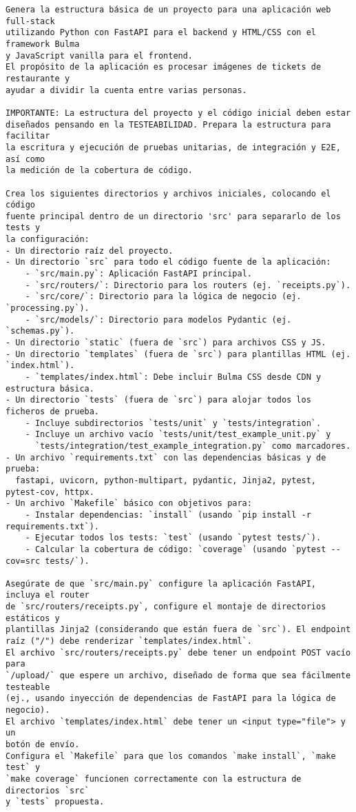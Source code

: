 \documentclass[a4paper, 11pt]{article}
\begin{document}
\begin{verbatim}
Genera la estructura básica de un proyecto para una aplicación web full-stack 
utilizando Python con FastAPI para el backend y HTML/CSS con el framework Bulma 
y JavaScript vanilla para el frontend. 
El propósito de la aplicación es procesar imágenes de tickets de restaurante y 
ayudar a dividir la cuenta entre varias personas.

IMPORTANTE: La estructura del proyecto y el código inicial deben estar 
diseñados pensando en la TESTEABILIDAD. Prepara la estructura para facilitar 
la escritura y ejecución de pruebas unitarias, de integración y E2E, así como 
la medición de la cobertura de código.

Crea los siguientes directorios y archivos iniciales, colocando el código 
fuente principal dentro de un directorio 'src' para separarlo de los tests y 
la configuración:
- Un directorio raíz del proyecto.
- Un directorio `src` para todo el código fuente de la aplicación:
    - `src/main.py`: Aplicación FastAPI principal.
    - `src/routers/`: Directorio para los routers (ej. `receipts.py`).
    - `src/core/`: Directorio para la lógica de negocio (ej. `processing.py`).
    - `src/models/`: Directorio para modelos Pydantic (ej. `schemas.py`).
- Un directorio `static` (fuera de `src`) para archivos CSS y JS.
- Un directorio `templates` (fuera de `src`) para plantillas HTML (ej. `index.html`).
    - `templates/index.html`: Debe incluir Bulma CSS desde CDN y estructura básica.
- Un directorio `tests` (fuera de `src`) para alojar todos los ficheros de prueba.
    - Incluye subdirectorios `tests/unit` y `tests/integration`.
    - Incluye un archivo vacío `tests/unit/test_example_unit.py` y 
      `tests/integration/test_example_integration.py` como marcadores.
- Un archivo `requirements.txt` con las dependencias básicas y de prueba: 
  fastapi, uvicorn, python-multipart, pydantic, Jinja2, pytest, pytest-cov, httpx.
- Un archivo `Makefile` básico con objetivos para:
    - Instalar dependencias: `install` (usando `pip install -r requirements.txt`).
    - Ejecutar todos los tests: `test` (usando `pytest tests/`).
    - Calcular la cobertura de código: `coverage` (usando `pytest --cov=src tests/`).

Asegúrate de que `src/main.py` configure la aplicación FastAPI, incluya el router 
de `src/routers/receipts.py`, configure el montaje de directorios estáticos y 
plantillas Jinja2 (considerando que están fuera de `src`). El endpoint 
raíz ("/") debe renderizar `templates/index.html`.
El archivo `src/routers/receipts.py` debe tener un endpoint POST vacío para 
`/upload/` que espere un archivo, diseñado de forma que sea fácilmente testeable 
(ej., usando inyección de dependencias de FastAPI para la lógica de negocio).
El archivo `templates/index.html` debe tener un <input type="file"> y un 
botón de envío.
Configura el `Makefile` para que los comandos `make install`, `make test` y 
`make coverage` funcionen correctamente con la estructura de directorios `src` 
y `tests` propuesta.
\end{verbatim}
\end{document}
